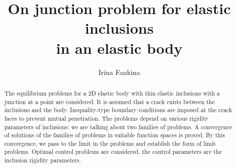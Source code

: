 \begin{englishtitle} %
\title{On junction problem for  elastic inclusions\\in an elastic body}
\author{Irina Fankina
}

\maketitle

\begin{abstract}
The equilibrium problems for a 2D elastic body with thin elastic inclusions with a junction at a point are considered. It is assumed that a crack exists between the inclusions and the body. Inequality-type boundary conditions are imposed at the crack faces to prevent mutual penetration. The problems depend on various rigidity parameters of inclusions: we are talking about two families of problems. A convergence of solutions of the families of problems in suitable function spaces is proved. By this convergence, we pass to the limit in the problems and establish the form of limit problems. Optimal control problems are considered, the control parameters are the inclusion rigidity parameters.

\end{abstract}
\end{englishtitle}

\iffalse
%
%


\documentclass[12pt]{llncs}


\usepackage{iftex}

\ifPDFTeX
\usepackage[T2A]{fontenc}
\usepackage[utf8]{inputenc} %
\usepackage[english,russian]{babel}
\fi

